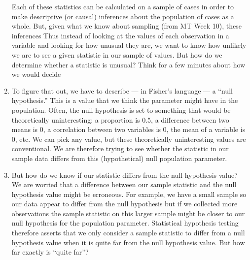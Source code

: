 \documentclass[a4paper,12pt]{article}
\begin{document}
\begin{enumerate}
Each of these statistics can be calculated on a sample of cases in order to make descriptive (or causal) inferences about the population of cases as a whole. But, given what we know about sampling (from MT Week 10), these inferences
 Thus instead of looking at the values of each observation in a variable and looking for how unusual they are, we want to know how unlikely we are to see a given statistic in our sample of values. But how do we determine whether a statistic is unusual? Think for a few minutes about how we would decide



\item To figure that out, we have to describe --- in Fisher's language --- a ``null hypothesis.'' This is a value that we think the parameter might have in the population. Often, the null hypothesis is set to something that would be theoretically uninteresting: a proportion is 0.5, a difference between two means is 0, a correlation between two variables is 0, the mean of a variable is 0, etc. We can pick any value, but these theoretically uninteresting values are conventional. We are therefore trying to see whether the statistic in our sample data differs from this (hypothetical) null population parameter.

\item But how do we know if our statistic differs from the null hypothesis value? We are worried that a difference between our sample statistic and the null hypothesis value might be erroneous. For example, we have a small sample so our data appear to differ from the null hypothesis but if we collected more observations the sample statistic on this larger sample might be closer to our null hypothesis for the population parameter. Statistical hypothesis testing therefore asserts that we only consider a sample statistic to differ from a null hypothesis value when it is quite far from the null hypothesis value. But how far exactly is ``quite far''?


\end{enumerate}
\end{document}
